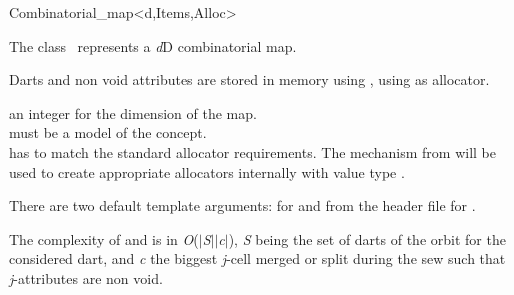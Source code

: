 \ccRefPageBegin

\begin{ccRefClass}{Combinatorial_map<d,Items,Alloc>}


\ccDefinition
  
The class \ccRefName\ represents a \emph{d}D combinatorial map.

Darts and non void attributes are stored in memory using
, using  as allocator.

\ccIsModel
{}

\ccParameters
{} an integer for the dimension of the map.\\
 must be a model of the  concept. \\
 has to match the standard allocator requirements. The   mechanism from 
 will be used to create appropriate allocators internally with value type .

There are two default template arguments:
 for  and
 from the  header file for .

\ccTypes
{}
\ccGlue
{}


The complexity of  and  is in \emph{O}($|$\emph{S}$|$\mytimes{}$|$\emph{c}$|$), \emph{S}
being the set of darts of the orbit
\orbit{\betaun{},\myldots{},\betaimdeux{},\betaipdeux{},\myldots{},\betad{}} for the
considered dart, and \emph{c} the biggest \emph{j}-cell merged or
split during the sew such that \emph{j}-attributes are non void.



\end{ccRefClass}

